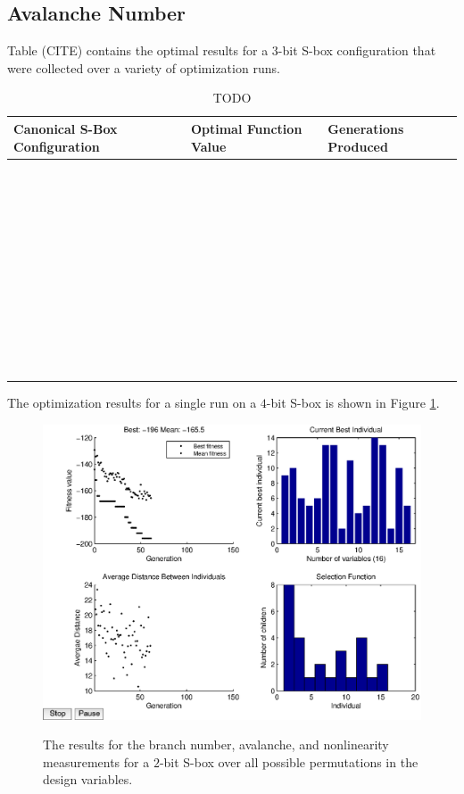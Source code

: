 \documentclass[11pt]{article}
\begin{document}
\subsection{Avalanche Number}

Table (CITE) contains the optimal results for a $3$-bit S-box configuration that were collected over a variety of optimization runs. 

\begin{table}
	\centering
	\label{avTable}
	\caption{TODO}
    \begin{tabular}{|l|l|l|}
        \hline
        Canonical S-Box Configuration & Optimal Function Value & Generations Produced \\ \hline
        ~ & ~ & ~ \\ 
        ~ & ~ & ~ \\ 
        ~ & ~ & ~ \\ 
        ~ & ~ & ~ \\ 
        ~ & ~ & ~ \\ 
        ~ & ~ & ~ \\ 
        ~ & ~ & ~ \\ 
        ~ & ~ & ~ \\ 
        ~ & ~ & ~ \\ 
        ~ & ~ & ~ \\
        \hline
    \end{tabular}
\end{table}

The optimization results for a single run on a $4$-bit S-box is shown in Figure \ref{av16}.
\begin{figure}
\centering
	\includegraphics[scale=0.5]{images/avalanche_results16.eps} \\
	\label{av16}
	\caption{The results for the branch number, avalanche, and nonlinearity measurements for a $2$-bit S-box over all possible permutations in the design variables. }
\end{figure}
\end{document}
